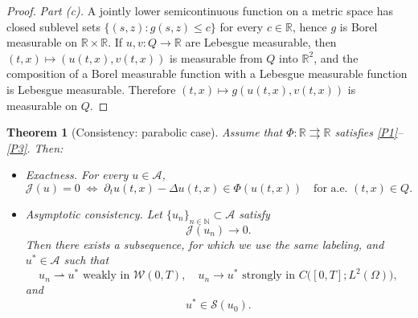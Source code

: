\documentclass[11pt]{elsarticle}
\newtheorem{theorem}{Theorem}[section]
\theoremstyle{definition}
\theoremstyle{remark}
\numberwithin{equation}{section}
\begin{document}
\begin{proof}
	\emph{Part (c).} A jointly lower semicontinuous function on a metric
	space has closed sublevel sets $\{(s,z):g(s,z)\le c\}$ for every
	$c\in\mathbb{R}$, hence $g$ is Borel measurable on $\mathbb{R}\times\mathbb{R}$.
	If $u,v:Q\to\mathbb{R}$ are Lebesgue measurable, then
	$(t,x)\mapsto(u(t,x),v(t,x))$ is measurable from $Q$ into $\mathbb{R}^2$, and
	the composition of a Borel measurable function with a Lebesgue measurable
	function is Lebesgue measurable. Therefore $(t,x)\mapsto g(u(t,x),v(t,x))$
	is measurable on $Q$.
\end{proof}
	
	\begin{theorem}[Consistency: parabolic case]
		\label{thm:consistency-parabolic}
		Assume that $\Phi:\mathbb{R}\rightrightarrows\mathbb{R}$
		satisfies {\rm \ref{P1}--\ref{P3}}. Then:
		
		\begin{itemize}
			\item[(a)] \emph{Exactness.} For every $u\in\mathcal{A}$,
			\[
			\mathcal{J}(u)=0
			\;\Longleftrightarrow\;
			\partial_tu(t,x)-\Delta u(t,x)
			\in\Phi(u(t,x))
			\quad\text{for a.e. }(t,x)\in Q.
			\]
			
			\item[(b)] \emph{Asymptotic consistency.} Let
			$\{u_n\}_{n\in\mathbb{N}}\subset\mathcal{A}$ satisfy
			\[
			\mathcal{J}(u_n)\longrightarrow 0.
			\]
			Then there exists a subsequence, for which we use the same labeling, and
			$u^\ast\in\mathcal{A}$ such that
			\[
			u_n\rightharpoonup u^\ast
			\text{ weakly in }\mathcal{W}(0,T),
			\quad
			u_n\longrightarrow u^\ast
			\text{ strongly in }
			C\bigl([0,T];L^2(\Omega)\bigr),
			\]
			and
			\[
			u^\ast\in\mathcal{S}(u_0).
			\]
		\end{itemize}
	\end{theorem}
	
\end{document}
